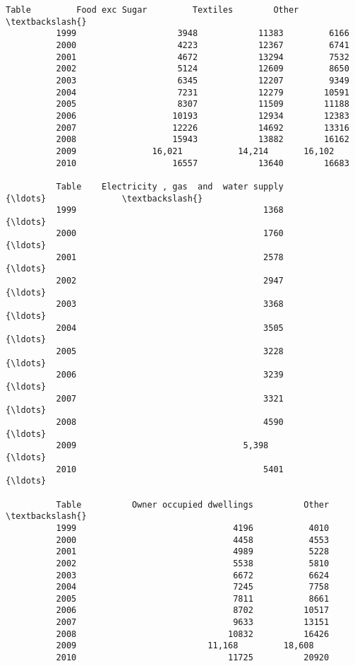 \documentclass[11pt]{article}
\begin{document}
\begin{Verbatim}[commandchars=\\\{\}]
          Table         Food exc Sugar         Textiles        Other  \textbackslash{}
          1999                    3948            11383         6166   
          2000                    4223            12367         6741   
          2001                    4672            13294         7532   
          2002                    5124            12609         8650   
          2003                    6345            12207         9349   
          2004                    7231            12279        10591   
          2005                    8307            11509        11188   
          2006                   10193            12934        12383   
          2007                   12226            14692        13316   
          2008                   15943            13882        16162   
          2009               16,021           14,214       16,102      
          2010                   16557            13640        16683   
          
          Table    Electricity , gas  and  water supply              {\ldots}               \textbackslash{}
          1999                                     1368              {\ldots}                
          2000                                     1760              {\ldots}                
          2001                                     2578              {\ldots}                
          2002                                     2947              {\ldots}                
          2003                                     3368              {\ldots}                
          2004                                     3505              {\ldots}                
          2005                                     3228              {\ldots}                
          2006                                     3239              {\ldots}                
          2007                                     3321              {\ldots}                
          2008                                     4590              {\ldots}                
          2009                                 5,398                 {\ldots}                
          2010                                     5401              {\ldots}                
          
          Table          Owner occupied dwellings          Other  \textbackslash{}
          1999                               4196           4010   
          2000                               4458           4553   
          2001                               4989           5228   
          2002                               5538           5810   
          2003                               6672           6624   
          2004                               7245           7758   
          2005                               7811           8661   
          2006                               8702          10517   
          2007                               9633          13151   
          2008                              10832          16426   
          2009                          11,168         18,608      
          2010                              11725          20920   
          

\end{Verbatim}
\end{document}
